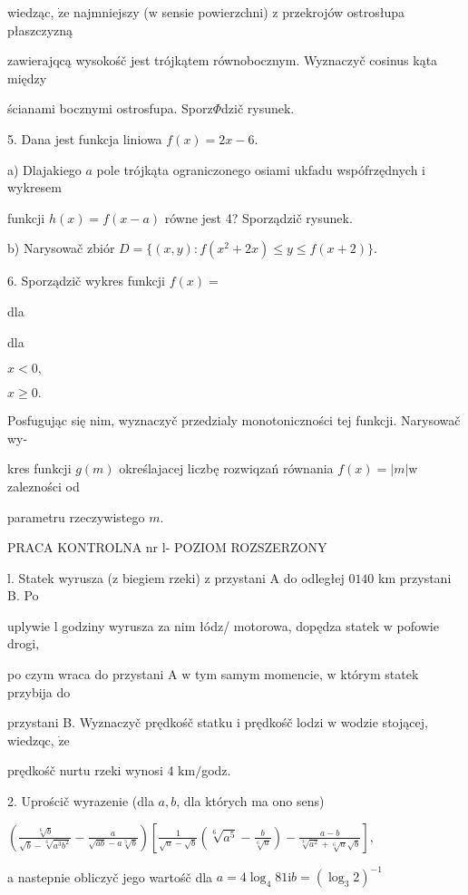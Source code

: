 \documentclass[a4paper,12pt]{article}
\begin{document}
wiedząc, $\dot{\mathrm{z}}\mathrm{e}$ najmniejszy ($\mathrm{w}$ sensie powierzchni) $\mathrm{z}$ przekrojów ostrosłupa płaszczyzną

zawierajqcą wysokośč jest trójkątem równobocznym. Wyznaczyč cosinus kąta między

ścianami bocznymi ostrosfupa. Sporz$\Phi$dzič rysunek.

5. Dana jest funkcja liniowa $f(x)=2x-6.$

a) Dlajakiego $a$ pole trójkąta ograniczonego osiami ukfadu wspófrzędnych $\mathrm{i}$ wykresem

funkcji $h(x)=f(x-a)$ równe jest 4? Sporządzič rysunek.

b) Narysowač zbiór $D=\{(x,y):f(x^{2}+2x)\leq y\leq f(x+2)\}.$

6. Sporządzič wykres funkcji $f(x)=$

dla

dla

$x<0,$

$x\geq 0.$

Posfugując się nim, wyznaczyč przedzialy monotoniczności tej funkcji. Narysowač wy-

kres funkcji $g(m)$ określajacej liczbę rozwiqzań równania $f(x)=|m| \mathrm{w}$ zalezności od

parametru rzeczywistego $m.$




PRACA KONTROLNA nr l- POZIOM ROZSZERZONY

l. Statek wyrusza ($\mathrm{z}$ biegiem rzeki) $\mathrm{z}$ przystani A do odległej $0 140$ km przystani B. Po

uplywie l godziny wyrusza za nim łódz/ motorowa, dopędza statek $\mathrm{w}$ pofowie drogi,

po czym wraca do przystani A $\mathrm{w}$ tym samym momencie, $\mathrm{w}$ którym statek przybija do

przystani B. Wyznaczyč prędkośč statku $\mathrm{i}$ prędkośč lodzi $\mathrm{w}$ wodzie stojącej, wiedzqc, $\dot{\mathrm{z}}\mathrm{e}$

prędkośč nurtu rzeki wynosi 4 $\mathrm{k}\mathrm{m}/$godz.

2. Uprościč wyrazenie (dla $a, b$, dla których ma ono sens)

$(\displaystyle \frac{\sqrt[6]{b}}{\sqrt{b}-\sqrt[6]{a^{3}b^{2}}}-\frac{a}{\sqrt{ab}-a\sqrt[3]{b}})[\frac{1}{\sqrt{a}-\sqrt{b}}(\sqrt[6]{a^{5}}-\frac{b}{\sqrt[6]{a}})-\frac{a-b}{\sqrt[3]{a^{2}}+\sqrt[6]{a}\sqrt{b}}],$

a nastepnie obliczyč jego wartośč dla $a=4\log_{4}81 \mathrm{i} b=(\log_{3}2)^{-1}$
\end{document}
